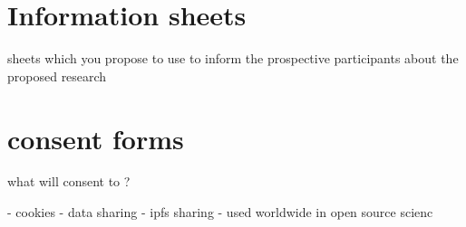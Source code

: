 

\section{Information sheets}
sheets  which you propose to use to inform the prospective participants about the proposed research



\section{consent forms}

what will consent to ?

- cookies
- data sharing
- ipfs sharing
- used worldwide in open source scienc
